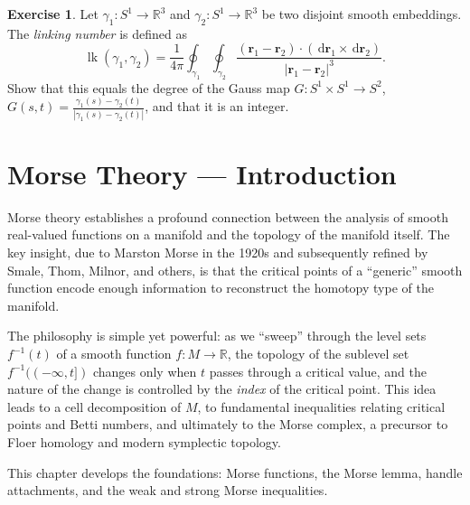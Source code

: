 \documentclass[12pt,a4paper,openany]{book}
\theoremstyle{definition}
\newtheorem{exercise}{Exercise}[chapter]
\theoremstyle{remark}
\newcommand{\R}{\mathbb{R}}
\newcommand{\dd}{\,\mathrm{d}}
\newcommand{\abs}[1]{\left\lvert #1 \right\rvert}
\begin{document}
\begin{exercise}\label{exo:linking-number}
Let $\gamma_1\colon S^1\to\R^3$ and $\gamma_2\colon S^1\to\R^3$ be
two disjoint smooth embeddings.  The \emph{linking number} is defined as
\[
  \operatorname{lk}(\gamma_1,\gamma_2)
  = \frac{1}{4\pi}\oint_{\gamma_1}\oint_{\gamma_2}
  \frac{(\mathbf{r}_1-\mathbf{r}_2)\cdot(\dd\mathbf{r}_1\times\dd\mathbf{r}_2)}
  {\abs{\mathbf{r}_1-\mathbf{r}_2}^3}.
\]
Show that this equals the degree of the Gauss map
$G\colon S^1\times S^1\to S^2$, $G(s,t) = \frac{\gamma_1(s)-\gamma_2(t)}
{\abs{\gamma_1(s)-\gamma_2(t)}}$, and that it is an integer.
\end{exercise}



\chapter{Morse Theory --- Introduction}\label{ch:morse}
\minitoc\vspace{1cm}

Morse theory establishes a profound connection between the analysis
of smooth real-valued functions on a manifold and the topology of the
manifold itself. The key insight, due to Marston Morse in the 1920s
and subsequently refined by Smale, Thom, Milnor, and others, is that
the critical points of a ``generic'' smooth function encode
enough information to reconstruct the homotopy type of the manifold.

The philosophy is simple yet powerful: as we ``sweep'' through the
level sets $f^{-1}(t)$ of a smooth function $f\colon M \to \R$, the
topology of the sublevel set $f^{-1}((-\infty,t])$ changes only when $t$
passes through a critical value, and the nature of the change is
controlled by the \emph{index} of the critical point. This idea leads
to a cell decomposition of $M$, to fundamental inequalities relating
critical points and Betti numbers, and ultimately to the Morse complex,
a precursor to Floer homology and modern symplectic topology.

This chapter develops the foundations: Morse functions, the Morse lemma,
handle attachments, and the weak and strong Morse inequalities.

\end{document}

